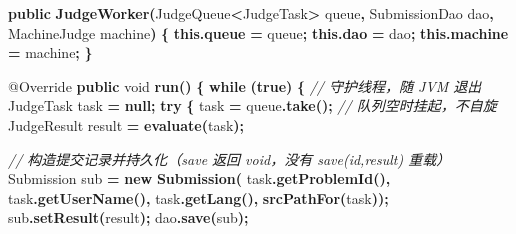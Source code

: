 \documentclass[
  11pt,
]{ctexart}
\newenvironment{Shaded}{\begin{snugshade}}{\end{snugshade}}
\newcommand{\AttributeTok}[1]{\textcolor[rgb]{0.13,0.29,0.53}{#1}}
\newcommand{\CommentTok}[1]{\textcolor[rgb]{0.56,0.35,0.01}{\textit{#1}}}
\newcommand{\ControlFlowTok}[1]{\textcolor[rgb]{0.13,0.29,0.53}{\textbf{#1}}}
\newcommand{\DataTypeTok}[1]{\textcolor[rgb]{0.13,0.29,0.53}{#1}}
\newcommand{\FunctionTok}[1]{\textcolor[rgb]{0.13,0.29,0.53}{\textbf{#1}}}
\newcommand{\KeywordTok}[1]{\textcolor[rgb]{0.13,0.29,0.53}{\textbf{#1}}}
\newcommand{\NormalTok}[1]{#1}
\newcommand{\OperatorTok}[1]{\textcolor[rgb]{0.81,0.36,0.00}{\textbf{#1}}}
\begin{document}
\begin{Shaded}
\begin{Highlighting}[]
    \KeywordTok{public} \FunctionTok{JudgeWorker}\OperatorTok{(}\NormalTok{JudgeQueue}\OperatorTok{\textless{}}\NormalTok{JudgeTask}\OperatorTok{\textgreater{}}\NormalTok{ queue}\OperatorTok{,}
\NormalTok{                       SubmissionDao dao}\OperatorTok{,}
\NormalTok{                       MachineJudge machine}\OperatorTok{)} \OperatorTok{\{}
        \KeywordTok{this}\OperatorTok{.}\FunctionTok{queue}   \OperatorTok{=}\NormalTok{ queue}\OperatorTok{;}
        \KeywordTok{this}\OperatorTok{.}\FunctionTok{dao}     \OperatorTok{=}\NormalTok{ dao}\OperatorTok{;}
        \KeywordTok{this}\OperatorTok{.}\FunctionTok{machine} \OperatorTok{=}\NormalTok{ machine}\OperatorTok{;}
    \OperatorTok{\}}

    \AttributeTok{@Override}
    \KeywordTok{public} \DataTypeTok{void} \FunctionTok{run}\OperatorTok{()} \OperatorTok{\{}
        \ControlFlowTok{while} \OperatorTok{(}\KeywordTok{true}\OperatorTok{)} \OperatorTok{\{}                          \CommentTok{// 守护线程，随 JVM 退出}
\NormalTok{            JudgeTask task }\OperatorTok{=} \KeywordTok{null}\OperatorTok{;}
            \ControlFlowTok{try} \OperatorTok{\{}
\NormalTok{                task }\OperatorTok{=}\NormalTok{ queue}\OperatorTok{.}\FunctionTok{take}\OperatorTok{();}            \CommentTok{// 队列空时挂起，不自旋}
\NormalTok{                JudgeResult result }\OperatorTok{=} \FunctionTok{evaluate}\OperatorTok{(}\NormalTok{task}\OperatorTok{);}

                \CommentTok{// 构造提交记录并持久化（save 返回 void，没有 save(id,result) 重载）}
\NormalTok{                Submission sub }\OperatorTok{=} \KeywordTok{new} \FunctionTok{Submission}\OperatorTok{(}
\NormalTok{                    task}\OperatorTok{.}\FunctionTok{getProblemId}\OperatorTok{(),}\NormalTok{ task}\OperatorTok{.}\FunctionTok{getUserName}\OperatorTok{(),}
\NormalTok{                    task}\OperatorTok{.}\FunctionTok{getLang}\OperatorTok{(),} \FunctionTok{srcPathFor}\OperatorTok{(}\NormalTok{task}\OperatorTok{));}
\NormalTok{                sub}\OperatorTok{.}\FunctionTok{setResult}\OperatorTok{(}\NormalTok{result}\OperatorTok{);}
\NormalTok{                dao}\OperatorTok{.}\FunctionTok{save}\OperatorTok{(}\NormalTok{sub}\OperatorTok{);}


\end{Highlighting}
\end{Shaded}
\end{document}
